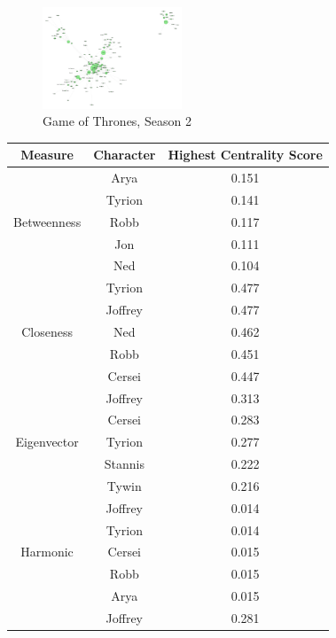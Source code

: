 \documentclass[10pt,twocolumn,letterpaper]{article}
\begin{document}
\begin{figure}[!h]
    \centering
    \includegraphics[width=0.37\textwidth]{img/s2/pagerank_network.jpg}
    \caption{\small{Game of Thrones, Season 2}}
\end{figure}

\begin{table}[!h]
    \centering
    \small
    \begin{tabular}{c|c|c}
        Measure & Character & \small{Highest Centrality Score} \\
        \hline
                    & Arya & 0.151 \\
                    & Tyrion & 0.141 \\
        Betweenness & Robb & 0.117 \\
                    & Jon & 0.111 \\
                    & Ned & 0.104 \\
        \hline 
                    & Tyrion & 0.477 \\
                    & Joffrey & 0.477 \\
        Closeness   & Ned & 0.462 \\
                    & Robb & 0.451 \\
                    & Cersei & 0.447 \\
        \hline 
                    & Joffrey & 0.313 \\
                    & Cersei & 0.283 \\
        Eigenvector & Tyrion & 0.277 \\
                    & Stannis & 0.222 \\
                    & Tywin & 0.216 \\
        \hline 
                    & Joffrey & 0.014 \\
                    & Tyrion & 0.014 \\
        Harmonic    & Cersei & 0.015 \\
                    & Robb & 0.015 \\
                    & Arya & 0.015 \\
        \hline
                    & Joffrey & 0.281 \\

\end{tabular}
\end{table}
\end{document}
